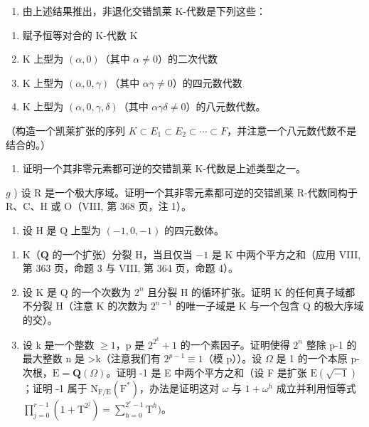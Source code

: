 \begin{enumerate}
\def\labelenumi{\alph{enumi})}
\setcounter{enumi}{4}
\tightlist
\item
  由上述结果推出，非退化交错凯莱 K-代数是下列这些：
\end{enumerate}

\begin{enumerate}
\def\labelenumi{(\roman{enumi})}
\item
  赋予恒等对合的 K-代数 \(\mathrm{K}\)
\item
  K 上型为 \((\alpha,0)\)（其中 \(\alpha\neq0\)）的二次代数
\item
  K 上型为 \((\alpha,0,\gamma)\)（其中 \(\alpha\gamma\neq0\)）的四元数代数
\item
  \(\mathrm{K}\) 上型为 \((\alpha, 0, \gamma, \delta)\)（其中 \(\alpha \gamma \delta \neq 0\)）的八元数代数。
\end{enumerate}

（构造一个凯莱扩张的序列 \(K \subset E_{1} \subset E_{2} \subset \cdots \subset F\)，并注意一个八元数代数不是结合的。）

\begin{enumerate}
\def\labelenumi{\alph{enumi})}
\setcounter{enumi}{5}
\tightlist
\item
  证明一个其非零元素都可逆的交错凯莱 K-代数是上述类型之一。
\end{enumerate}

\(g\) ) 设 R 是一个极大序域。证明一个其非零元素都可逆的交错凯莱 R-代数同构于 R、C、H 或 O（VIII, 第 368 页，注 1）。

\begin{enumerate}
\def\labelenumi{\arabic{enumi})}
\setcounter{enumi}{5}
\tightlist
\item
  设 H 是 Q 上型为 \((-1,0,-1)\) 的四元数体。
\end{enumerate}

\begin{enumerate}
\def\labelenumi{\alph{enumi})}
\item
  \(\mathrm{K}\)（\(\mathbf{Q}\) 的一个扩张）分裂 \(\mathrm{H}\)，当且仅当 \(-1\) 是 \(\mathrm{K}\) 中两个平方之和（应用 VIII, 第 363 页，命题 3 与 VIII, 第 364 页，命题 4）。
\item
  设 K 是 Q 的一个次数为 \(2^{n}\) 且分裂 H 的循环扩张。证明 K 的任何真子域都不分裂 H（注意 K 的次数为 \(2^{n-1}\) 的唯一子域是 K 与一个包含 Q 的极大序域的交）。
\item
  设 k 是一个整数 \(\geqslant1\)，p 是 \(2^{2^{k}}+1\) 的一个素因子。证明使得 \(2^{n}\) 整除 p-1 的最大整数 n 是 \textgreater k（注意我们有 \(2^{p-1}\equiv1\)（模 p））。设 \(\Omega\) 是 1 的一个本原 p-次根，\(\mathrm{E}=\mathbf{Q}(\Omega)\)。证明 -1 是 E 中两个平方之和（设 F 是扩张 \(\mathrm{E}(\sqrt{-1})\)；证明 -1 属于 \(\mathrm{N}_{\mathrm{F}/\mathrm{E}}(\mathrm{F}^{*})\)，办法是证明这对 \(\omega\) 与 \(1+\omega^{h}\) 成立并利用恒等式 \(\prod_{j=0}^{r-1}(1+\mathrm{T}^{2^{j}})=\sum_{h=0}^{2^{r}-1}\mathrm{T}^{h})\)。
\end{enumerate}

